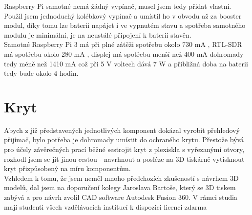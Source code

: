 \documentclass{ctuthesis}
\begin{document}
 Raspberry Pi samotné nemá žádný vypínač, musel jsem tedy přidat vlastní. Použil jsem jednoduchý kolébkový vypínač a umístil ho v obvodu až za booster modul, díky tomu lze baterii napájet i ve vypnutém stavu a spotřeba samotného modulu je minimální, je na neustálé připojení k baterii stavěn.\\
 Samotné Raspberry Pi 3 má při plné zátěži spotřebu okolo 730 mA \cite{powerpi}, RTL-SDR má spotřebu okolo 280 mA \cite{rtlsdrcom}, displej má spotřebu menší než 400 mA \cite{powerLCD} dohromady tedy méně než 1410 mA což při 5 V voltech dává 7 W a přibližná doba na baterii tedy bude okolo 4 hodin.
 
\section{Kryt}
Abych z již představených jednotlivých komponent dokázal vyrobit přehledový přijímač, bylo potřeba je dohromady umístit do ochraného krytu. Přestože bývá pro účely závěrečných prací běžné sestrojit kryt z plexiskla s vyřezanými otvory, rozhodl jsem se jít jinou cestou - navrhnout a posléze na 3D tiskárně vytisknout kryt přizpůsobený na míru komponentům. \\
Vzhledem k tomu, že jsem neměl mnoho předchozích zkušeností s návrhem 3D modelů, dal jsem na doporučení kolegy Jaroslava Bartoše, který se 3D tiskem zabývá a pro návrh zvolil CAD software Autodesk Fusion 360. V rámci studia mají studenti všech vzdělávacích institucí k dispozici licenci zdarma
\end{document}
